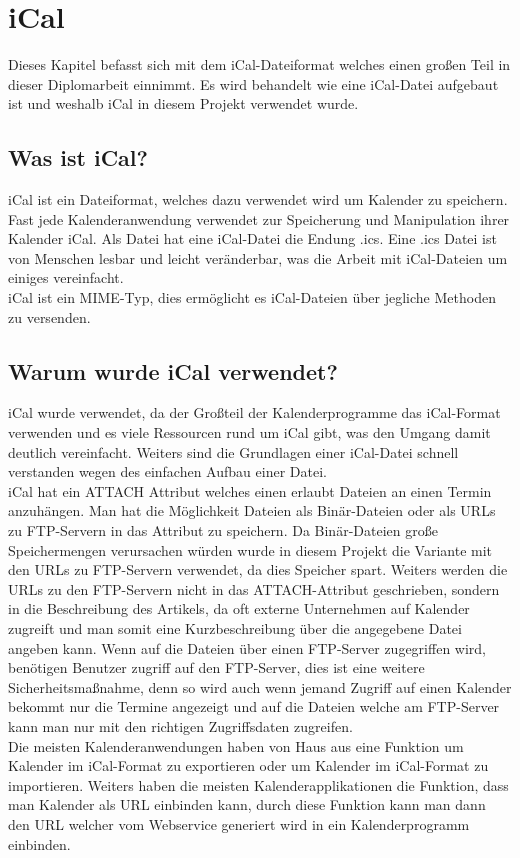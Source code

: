 
\renewcommand{\theauthor}{Matthias Franz}
\chapter{iCal}
\label{sec:iCal}
Dieses Kapitel befasst sich mit dem iCal-Dateiformat welches einen großen Teil in dieser Diplomarbeit einnimmt. Es wird behandelt wie eine iCal-Datei aufgebaut ist und weshalb iCal in diesem Projekt verwendet wurde.

\section{Was ist iCal?}
\label{sec:wasIstiCal?}
iCal ist ein Dateiformat, welches dazu verwendet wird um Kalender zu speichern. Fast jede Kalenderanwendung verwendet zur Speicherung und Manipulation ihrer Kalender iCal. Als Datei hat eine iCal-Datei die Endung .ics. Eine .ics Datei ist von Menschen lesbar und leicht veränderbar, was die Arbeit mit iCal-Dateien um einiges vereinfacht. \\
iCal ist ein MIME-Typ, dies ermöglicht es iCal-Dateien über jegliche Methoden zu versenden.\\ \textcite{iCalDocumentation} 

\section{Warum wurde iCal verwendet?}
\label{sec:warumWurdeiCalVerwendet?}
iCal wurde verwendet, da der Großteil der Kalenderprogramme das iCal-Format verwenden und es viele Ressourcen rund um iCal gibt, was den Umgang damit deutlich vereinfacht. Weiters sind die Grundlagen einer iCal-Datei schnell verstanden wegen des einfachen Aufbau einer Datei.\\
iCal hat ein ATTACH Attribut welches einen erlaubt Dateien an einen Termin anzuhängen. Man hat die Möglichkeit Dateien als Binär-Dateien oder als URLs zu FTP-Servern in das Attribut zu speichern. Da Binär-Dateien große Speichermengen verursachen würden wurde in diesem Projekt die Variante mit den URLs zu FTP-Servern verwendet, da dies Speicher spart. Weiters werden die URLs zu den FTP-Servern nicht in das ATTACH-Attribut geschrieben, sondern in die Beschreibung des Artikels, da oft externe Unternehmen auf Kalender zugreift und man somit eine Kurzbeschreibung über die angegebene Datei angeben kann. Wenn auf die Dateien über einen FTP-Server zugegriffen wird, benötigen Benutzer zugriff auf den FTP-Server, dies ist eine weitere Sicherheitsmaßnahme, denn so wird auch wenn jemand Zugriff auf einen Kalender bekommt nur die Termine angezeigt und auf die Dateien welche am FTP-Server kann man nur mit den richtigen Zugriffsdaten zugreifen.\\
Die meisten Kalenderanwendungen haben von Haus aus eine Funktion um Kalender im iCal-Format zu exportieren oder um Kalender im iCal-Format zu importieren. Weiters haben die meisten Kalenderapplikationen die Funktion, dass man Kalender als URL einbinden kann, durch diese Funktion kann man dann den URL welcher vom Webservice generiert wird in ein Kalenderprogramm einbinden.

